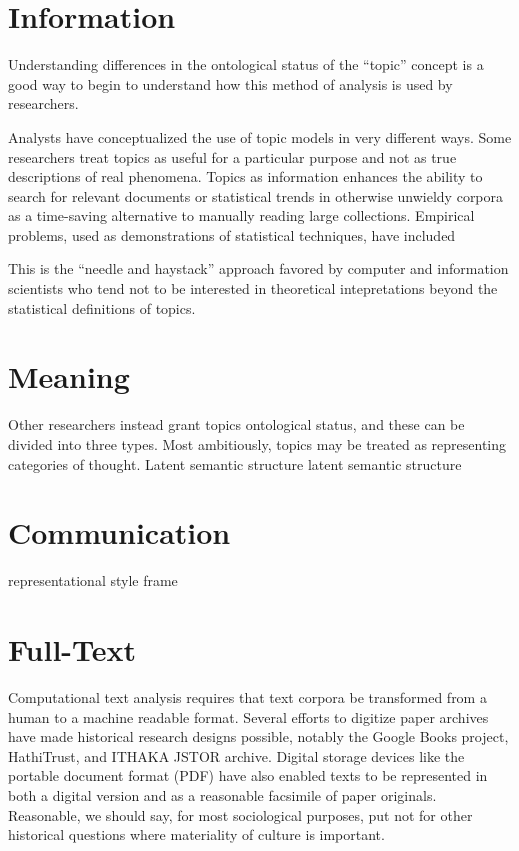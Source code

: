 \documentclass[]{book}
\theoremstyle{definition}
\theoremstyle{definition}
\theoremstyle{definition}
\theoremstyle{remark}
\begin{document}
\hypertarget{information}{%
\section{Information}\label{information}}

Understanding differences in the ontological status of the ``topic''
concept is a good way to begin to understand how this method of analysis
is used by researchers.

Analysts have conceptualized the use of topic models in very different
ways. Some researchers treat topics as useful for a particular purpose
and not as true descriptions of real phenomena. Topics as information
enhances the ability to search for relevant documents or statistical
trends in otherwise unwieldy corpora as a time-saving alternative to
manually reading large collections. \citep{Boyd-Graber2017Applications}
Empirical problems, used as demonstrations of statistical techniques,
have included

This is the ``needle and haystack'' approach favored by computer and
information scientists who tend not to be interested in theoretical
intepretations beyond the statistical definitions of topics.

\hypertarget{meaning}{%
\section{Meaning}\label{meaning}}

Other researchers instead grant topics ontological status, and these can
be divided into three types. Most ambitiously, topics may be treated as
representing categories of thought. Latent semantic structure latent
semantic structure \citep{WallachStatisticalTopicModels2011}

\hypertarget{communication}{%
\section{Communication}\label{communication}}

representational style \citep{Grimmer2016Measuring} frame
\citep{DiMaggio2013Exploiting}

\hypertarget{full-text}{%
\section{Full-Text}\label{full-text}}

Computational text analysis requires that text corpora be transformed
from a human to a machine readable format. Several efforts to digitize
paper archives have made historical research designs possible, notably
the Google Books project, HathiTrust, and ITHAKA JSTOR archive. Digital
storage devices like the portable document format (PDF) have also
enabled texts to be represented in both a digital version and as a
reasonable facsimile of paper originals. Reasonable, we should say, for
most sociological purposes, put not for other historical questions where
materiality of culture is important.
\citep[149]{Schreibman2014NonConsumptive}
\end{document}
